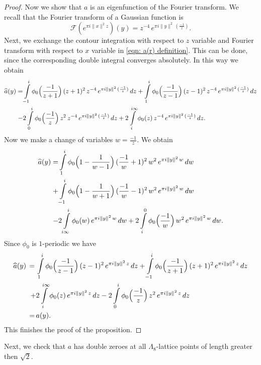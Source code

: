\begin{proof}
Now we show that $a$ is an eigenfunction of the Fourier transform. We recall that the Fourier transform of a Gaussian function is
\begin{equation}\label{eqn: Gaussian Fourier}\mathcal{F}(e^{\pi i  \|x\|^2 z})(y)=z^{-4}\,e^{\pi i \|y\|^2 \,(\frac{-1}{z}) }.\end{equation}
Next, we exchange the contour integration with respect to $z$ variable and Fourier transform  with respect to $x$ variable in \eqref{eqn: a(r) definition}. This can be done, since the corresponding double integral converges absolutely. In this way we obtain
\begin{align}
  \widehat{a}(y)=&\int\limits_{-1}^i\phi_0\Big(\frac{-1}{z+1}\Big)\,(z+1)^2\,z^{-4}\,e^{\pi i \|y\|^2 \,(\frac{-1}{z})}\,dz
  +\int\limits_{1}^i\phi_0\Big(\frac{-1}{z-1}\Big)\,(z-1)^2\,z^{-4}\,e^{\pi i \|y\|^2 \,(\frac{-1}{z})}\,dz\notag \\
  -&2\int\limits_{0}^i\phi_0\Big(\frac{-1}{z}\Big)\,z^2\,z^{-4}\,e^{\pi i \|y\|^2 \,(\frac{-1}{z})}\,dz +2\int\limits_{i}^{i\infty}\phi_0(z)\,z^{-4}\,e^{\pi i \|y\|^2 \,(\frac{-1}{z})}\,dz.\notag
\end{align}
Now we make a change of variables $w=\frac{-1}{z}$. We obtain
\begin{align}
  \widehat{a}(y)=&\int\limits_{1}^i\phi_0\Big(1-\frac{1}{w-1}\Big)\,(\frac{-1}{w}+1)^2\,w^{2}\,e^{\pi i \|y\|^2 \,w}\,dw\notag\\
  +&\int\limits_{-1}^i\phi_0\Big(1-\frac{1}{w+1}\Big)\,(\frac{-1}{w}-1)^2\,w^2\,e^{\pi i \|y\|^2 \,w}\,dw\\
  -&2\int\limits_{i \infty}^i\phi_0(w)\,e^{\pi i \|y\|^2 \,w}\,dw +2\int\limits_{i}^{0}\phi_0\Big(\frac{-1}{w}\Big)\,w^{2}\,e^{\pi i \|y\|^2 \,w}\,dw.\notag
\end{align}
Since $\phi_0$ is $1$-periodic we have
\begin{align}
  \widehat{a}(y)\,=\,&\int\limits_{1}^i\phi_0\Big(\frac{-1}{z-1}\Big)\,(z-1)^2\,e^{\pi i \|y\|^2 \,z}\,dz
  +\int\limits_{-1}^i\phi_0\Big(\frac{-1}{z+1}\Big)\,(z+1)^2\,e^{\pi i \|y\|^2 \,z}\,dz\notag \\
  +&2\int\limits_{i}^{i\infty}\phi_0(z)\,e^{\pi i \|y\|^2 \,z}\,dz
  -2\int\limits_{0}^{i}\phi_0\Big(\frac{-1}{z}\Big)\,z^{2}\,e^{\pi i \|y\|^2 \,z}\,dz\notag \\
  \,=\,&a(y).
\end{align}
This finishes the proof of the proposition.
\end{proof}

Next, we check that $a$ has double zeroes at all $\Lambda_8$-lattice points of length greater then $\sqrt{2}$.

